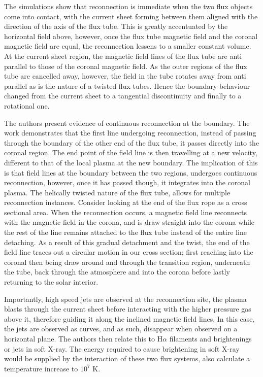 The simulations show that reconnection is immediate when the two flux objects come into contact, with the current sheet forming between them aligned with the direction of the axis of the flux tube.
This is greatly accentuated by the horizontal field above, however, once the flux tube magnetic field and the coronal magnetic field are equal, the reconnection lessens to a smaller constant volume. 
At the current sheet region, the magnetic field lines of the flux tube are anti parallel to those of the coronal magnetic field.
As the outer regions of the flux tube are cancelled away, however, the field in the tube rotates away from anti parallel as is the nature of a twisted flux tubes.
Hence the boundary behaviour changed from the current sheet to a tangential discontinuity and finally to a rotational one.

The authors present evidence of continuous reconnection at the boundary. 
The work demonstrates that the first line undergoing reconnection, instead of passing through the boundary of the other end of the flux tube, it passes directly into the coronal region.
The end point of the field line is then travelling at a new velocity, different to that of the local plasma at the new boundary.
The implication of this is that field lines at the boundary between the two regions, undergoes continuous reconnection, however, once it has passed though, it integrates into the coronal plasma.
The helically twisted nature of the flux tube, allows for multiple reconnection instances.
Consider looking at the end of the flux rope as a cross sectional area. 
When the reconnection occurs, a magnetic field line reconnects with the magnetic field in the corona, and is draw straight into the corona while the rest of the line remains attached to the flux tube instead of the entire line detaching.
As a result of this gradual detachment and the twist, the end of the field line traces out a circular motion in our cross section; first reaching into the coronal then being draw around and through the transition region, underneath the tube, back through the atmosphere and into the corona before lastly returning to the solar interior.

Importantly, high speed jets are observed at the reconnection site, the plasma blasts through the current sheet before interacting with the higher pressure gas above it, therefore guiding it along the inclined magnetic field lines.
In this case, the jets are observed as curves, and as such, disappear when observed on a horizontal plane.
The authors then relate this to H$\alpha$ filaments and brightenings or jets in soft X-ray. 
The energy required to cause brightening in soft X-ray would be supplied by the interaction of these two flux systems, \cite{Archontis2005} also calculate a temperature increase to $10^7$ K.

